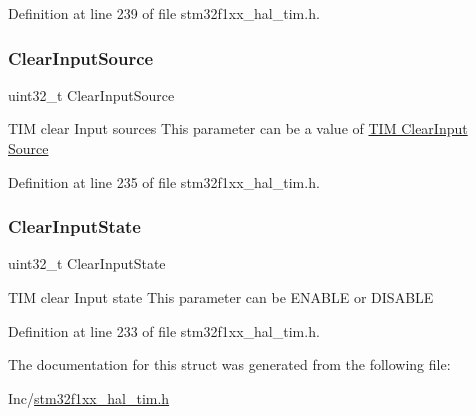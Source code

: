 Definition at line 239 of file stm32f1xx\+\_\+hal\+\_\+tim.\+h.

\mbox{\label{struct_t_i_m___clear_input_config_type_def_a53908db365bf0aa50a9217dcee98b61c}} 
\subsubsection{\texorpdfstring{Clear\+Input\+Source}{ClearInputSource}}
{\footnotesize\ttfamily uint32\+\_\+t Clear\+Input\+Source}

T\+IM clear Input sources This parameter can be a value of \hyperlink{group___t_i_m___clear_input___source}{T\+IM Clear\+Input Source} 

Definition at line 235 of file stm32f1xx\+\_\+hal\+\_\+tim.\+h.

\mbox{\label{struct_t_i_m___clear_input_config_type_def_ae375822fd9a07ebafaf13fc47db211db}} 
\subsubsection{\texorpdfstring{Clear\+Input\+State}{ClearInputState}}
{\footnotesize\ttfamily uint32\+\_\+t Clear\+Input\+State}

T\+IM clear Input state This parameter can be E\+N\+A\+B\+LE or D\+I\+S\+A\+B\+LE 

Definition at line 233 of file stm32f1xx\+\_\+hal\+\_\+tim.\+h.



The documentation for this struct was generated from the following file\+:\begin{DoxyCompactItemize}
\item 
Inc/\hyperlink{stm32f1xx__hal__tim_8h}{stm32f1xx\+\_\+hal\+\_\+tim.\+h}\end{DoxyCompactItemize}
